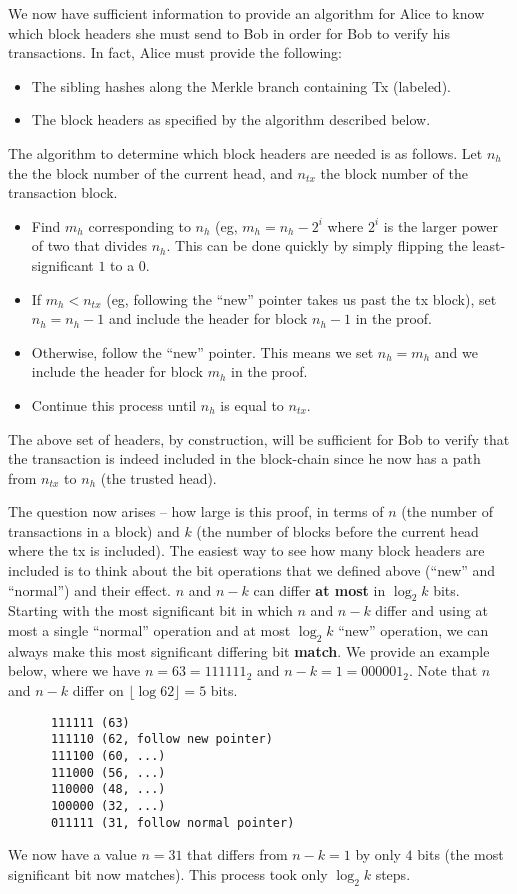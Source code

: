 \documentclass[12pt]{exam}
\begin{document}
\begin{questions}
\begin{solution}
\begin{enumerate}[label=\textbf{\alph*.}]
    We now have sufficient information to provide an algorithm for Alice to know which block headers she must send to Bob in order for Bob to verify his transactions. In fact, Alice must provide the following:
    \begin{itemize}
      \item The sibling hashes along the Merkle branch containing Tx (labeled).
      \item The block headers as specified by the algorithm described below.
    \end{itemize}

    The algorithm to determine which block headers are needed is as follows. Let $n_h$ the the block number of the current head, and $n_{tx}$ the block number of the transaction block.
    \begin{itemize}
      \item Find $m_{h}$ corresponding to $n_{h}$ (eg, $m_h = n_h - 2^i$ where $2^i$ is the larger power of two that divides $n_h$. This can be done quickly by simply flipping the least-significant $1$ to a $0$.
      \item If $m_h < n_{tx}$ (eg, following the ``new'' pointer takes us past the tx block), set $n_{h} = n_h - 1$ and include the header for block $n_h - 1$ in the proof.
      \item Otherwise, follow the ``new'' pointer. This means we set $n_h = m_h$ and we include the header for block $m_h$ in the proof.
      \item Continue this process until $n_h$ is equal to $n_{tx}$.
    \end{itemize}

    The above set of headers, by construction, will be sufficient for Bob to verify that the transaction is indeed included in the block-chain since he now has a path from $n_{tx}$ to $n_h$ (the trusted head).

    The question now arises -- how large is this proof, in terms of $n$ (the number of transactions in a block) and $k$ (the number of blocks before the current head where the tx is included). The easiest way to see how many block headers are included is to think about the bit operations that we defined above (``new'' and ``normal'') and their effect. $n$ and $n - k$ can differ \textbf{at most} in $\log_2 k$ bits. Starting with the most significant bit in which $n$ and $n-k$ differ and using at most a single ``normal'' operation and at most $\log_2 k$ ``new'' operation, we can always make this most significant differing bit \textbf{match}. We provide an example below, where we have $n = 63 = 111111_2$ and $n-k = 1 = 000001_2$. Note that $n$ and $n-k$ differ on $\lfloor \log 62 \rfloor = 5$ bits.
    \begin{verbatim}
      111111 (63)
      111110 (62, follow new pointer)
      111100 (60, ...)
      111000 (56, ...)
      110000 (48, ...)
      100000 (32, ...)
      011111 (31, follow normal pointer)
    \end{verbatim}
    We now have a value $n = 31$ that differs from $n-k = 1$ by only $4$ bits (the most significant bit now matches). This process took only $\log_2 k$ steps.


\end{enumerate}
\end{solution}
\end{questions}
\end{document}
